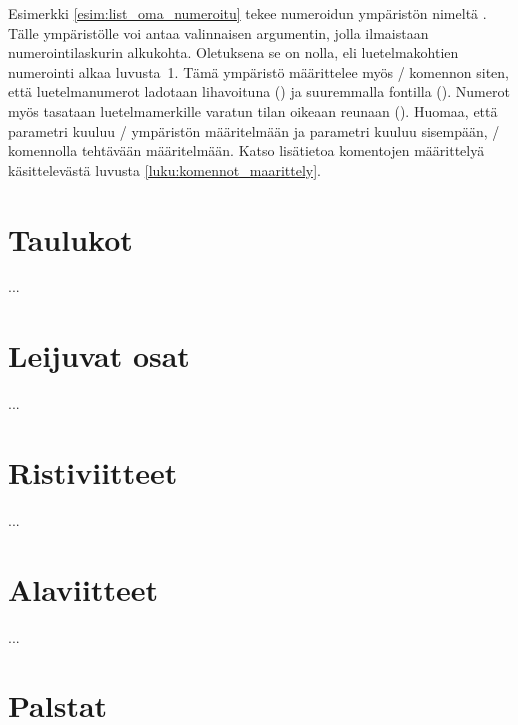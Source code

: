 Esimerkki \ref{esim:list_oma_numeroitu} tekee numeroidun ympäristön
nimeltä . Tälle ympäristölle voi antaa valinnaisen
argumentin, jolla ilmaistaan numerointilaskurin alkukohta. Oletuksena se
on nolla, eli luetelmakohtien numerointi alkaa luvusta~1. Tämä ympäristö
määrittelee myös \-/ komennon siten, että
luetelmanumerot ladotaan lihavoituna () ja suuremmalla
fontilla (). Numerot myös tasataan luetelmamerkille
varatun tilan oikeaan reunaan (). Huomaa, että parametri
 kuuluu \-/ ympäristön määritelmään ja
parametri  kuuluu sisempään, \-/
komennolla tehtävään määritelmään. Katso lisätietoa komentojen
määrittelyä käsittelevästä luvusta \ref{luku:komennot_maarittely}.

\section{Taulukot}
\label{luku:taulukot}

...


\section{Leijuvat osat}
\label{luku:leijuosat}

...


\section{Ristiviitteet}
\label{luku:ristiviitteet}

...

\section{Alaviitteet}
\label{luku:alaviitteet}

...



\section{Palstat}
\label{luku:palstat}

